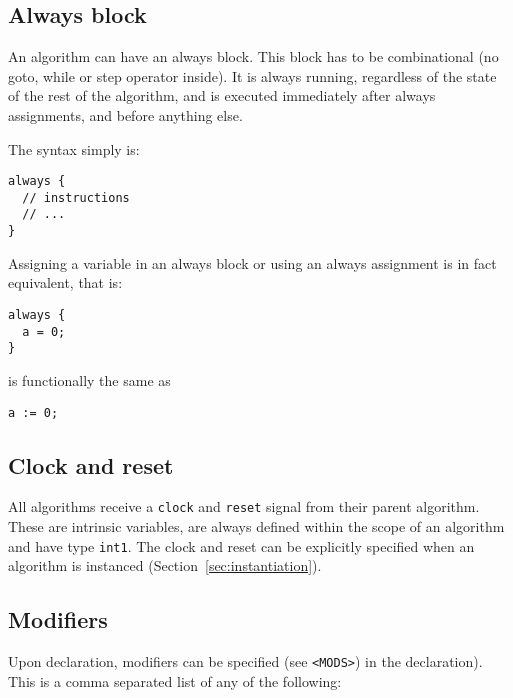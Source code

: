 \documentclass[a4]{article}
\begin{document}
\subsection{Always block}

An algorithm can have an always block. This block has to be combinational (no goto, while or step operator inside). It is always running, regardless of the state of the rest of the algorithm, and is executed immediately after always assignments, and before anything else.

The syntax simply is:

\begin{verbatim}
always {
  // instructions
  // ...
}
\end{verbatim}

Assigning a variable in an always block or using an always assignment is in fact equivalent, that is:

\begin{verbatim}
always {
  a = 0;
}
\end{verbatim}

\noindent is functionally the same as

\begin{verbatim}
a := 0;
\end{verbatim}


\subsection{Clock and reset}

All algorithms receive a \texttt{clock} and \texttt{reset} signal from their
parent algorithm. These are intrinsic variables, are always defined within
the scope of an algorithm and have type \texttt{int1}. The clock and reset
can be explicitly specified when an algorithm is instanced (Section~\ref{sec:instantiation}).


\subsection{Modifiers}

Upon declaration, modifiers can be specified (see \texttt{<MODS>}) in the declaration). This is a comma separated list of any of the following:
\end{document}
